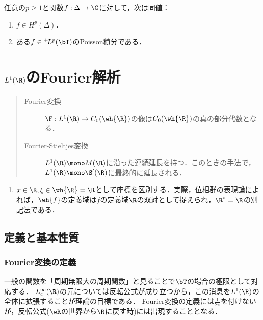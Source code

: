\documentclass[uplatex,dvipdfmx]{jsreport}
\begin{document}
\begin{theorem}
    任意の$p\ge1$と関数$f:\Delta\to\C$に対して，次は同値：
    \begin{enumerate}
        \item $f\in H^p(\Delta)$．
        \item ある$f\in{}^+\!L^p(\bT)$のPoisson積分である．
    \end{enumerate}
\end{theorem}

\chapter{$L^1(\R)$のFourier解析}

\begin{quotation}
    \begin{description}
        \item[Fourier変換] $\F:L^1(\R)\to C_0(\wh{\R})$の像は$C_0(\wh{\R})$の真の部分代数となる．
        \item[Fourier-Stieltjes変換] $L^1(\R)\mono M(\R)$に沿った連続延長を持つ．このときの手法で，$L^1(\R)\mono\S'(\R)$に最終的に延長される．
    \end{description}
\end{quotation}

\begin{notation}\mbox{}
    \begin{enumerate}
        \item $x\in\R,\xi\in\wh{\R}=\R$として座標を区別する．実際，位相群の表現論によれば，$\wh{f}$の定義域は$f$の定義域$\R$の双対として捉えられ，$\R^*=\R$の別記法である．
    \end{enumerate}
\end{notation}

\section{定義と基本性質}

\subsection{Fourier変換の定義}

\begin{tcolorbox}[colframe=ForestGreen, colback=ForestGreen!10!white,breakable,colbacktitle=ForestGreen!40!white,coltitle=black,fonttitle=\bfseries\sffamily,
title=]
    一般の関数を「周期無限大の周期関数」と見ることで$\bT$の場合の極限として対応する．
    $L_c^\infty(\R)$の元については反転公式が成り立つから，この消息を$L^1(\R)$の全体に拡張することが理論の目標である．
    Fourier変換の定義には$\frac{1}{2\pi}$を付けないが，反転公式($\wR$の世界から$\R$に戻す時)には出現することとなる．
\end{tcolorbox}
\end{document}
